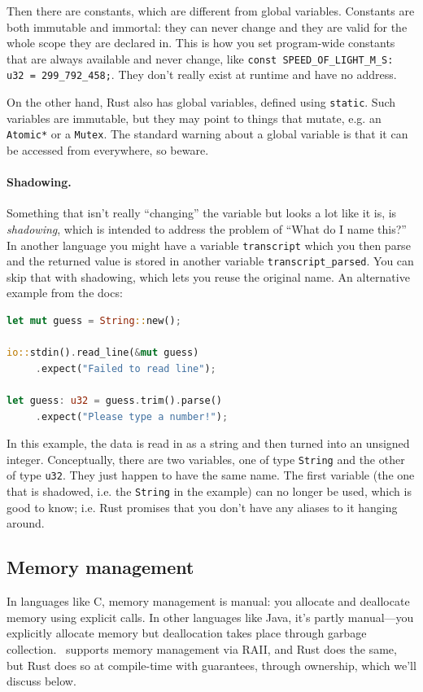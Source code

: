 Then there are constants, which are different from global variables. Constants are both immutable and immortal: they can never change and they are valid for the whole scope they are declared in. This is how you set program-wide constants that are always available and never change, like \texttt{const SPEED\_OF\_LIGHT\_M\_S: u32 = 299\_792\_458;}. They don't really exist at runtime and have no address.

On the other hand, Rust also has global variables, defined using \texttt{static}. Such variables are immutable, but they may point to things that mutate, e.g. an \texttt{Atomic*} or a \texttt{Mutex}. The standard warning about a global variable is that it can be accessed from everywhere, so beware.

\paragraph{Shadowing.}
Something that isn't really ``changing'' the variable but looks a lot like it is, is \textit{shadowing}, which is intended to address the problem of ``What do I name this?'' In another language you might have a variable \texttt{transcript} which you then parse and the returned value is stored in another variable \texttt{transcript\_parsed}. You can skip that with shadowing, which lets you reuse the original name. An alternative example from the docs:

\begin{lstlisting}[language=Rust]
let mut guess = String::new();

io::stdin().read_line(&mut guess)
     .expect("Failed to read line");

let guess: u32 = guess.trim().parse()
     .expect("Please type a number!");
\end{lstlisting}

In this example, the data is read in as a string and then turned into an unsigned integer. Conceptually, there are two variables, one of type \texttt{String} and the other of type \texttt{u32}. They just happen to have the same name. The first variable (the one that is shadowed, i.e. the \texttt{String} in the example) can no longer be used, which is good to know; i.e. Rust promises that you don't have any aliases to it hanging around.

\subsection*{Memory management}
In languages like C, memory management is manual: you allocate and deallocate memory using explicit calls. In other languages like Java, it's partly manual---you explicitly allocate memory but deallocation takes place through garbage collection. \CPP~supports memory management via RAII, and Rust does the same, but Rust does so at compile-time with guarantees, through ownership, which we'll discuss below.

